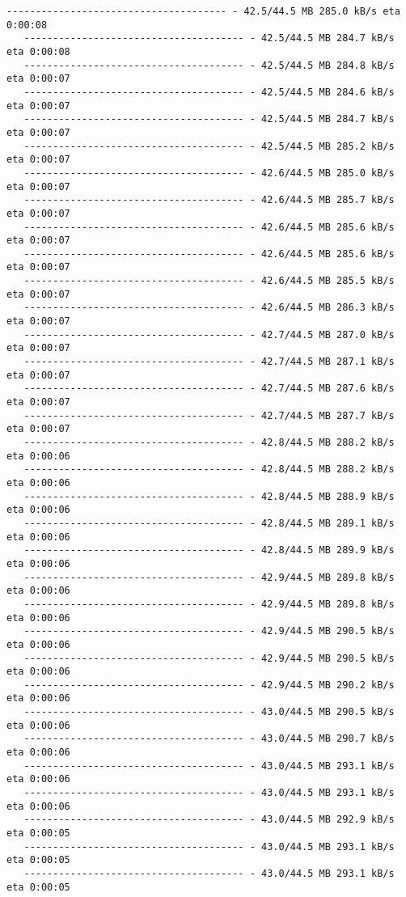 \documentclass[11pt]{article}
\begin{document}
\begin{Verbatim}[commandchars=\\\{\}]
   -------------------------------------- - 42.5/44.5 MB 285.0 kB/s eta 0:00:08
   -------------------------------------- - 42.5/44.5 MB 284.7 kB/s eta 0:00:08
   -------------------------------------- - 42.5/44.5 MB 284.8 kB/s eta 0:00:07
   -------------------------------------- - 42.5/44.5 MB 284.6 kB/s eta 0:00:07
   -------------------------------------- - 42.5/44.5 MB 284.7 kB/s eta 0:00:07
   -------------------------------------- - 42.5/44.5 MB 285.2 kB/s eta 0:00:07
   -------------------------------------- - 42.6/44.5 MB 285.0 kB/s eta 0:00:07
   -------------------------------------- - 42.6/44.5 MB 285.7 kB/s eta 0:00:07
   -------------------------------------- - 42.6/44.5 MB 285.6 kB/s eta 0:00:07
   -------------------------------------- - 42.6/44.5 MB 285.6 kB/s eta 0:00:07
   -------------------------------------- - 42.6/44.5 MB 285.5 kB/s eta 0:00:07
   -------------------------------------- - 42.6/44.5 MB 286.3 kB/s eta 0:00:07
   -------------------------------------- - 42.7/44.5 MB 287.0 kB/s eta 0:00:07
   -------------------------------------- - 42.7/44.5 MB 287.1 kB/s eta 0:00:07
   -------------------------------------- - 42.7/44.5 MB 287.6 kB/s eta 0:00:07
   -------------------------------------- - 42.7/44.5 MB 287.7 kB/s eta 0:00:07
   -------------------------------------- - 42.8/44.5 MB 288.2 kB/s eta 0:00:06
   -------------------------------------- - 42.8/44.5 MB 288.2 kB/s eta 0:00:06
   -------------------------------------- - 42.8/44.5 MB 288.9 kB/s eta 0:00:06
   -------------------------------------- - 42.8/44.5 MB 289.1 kB/s eta 0:00:06
   -------------------------------------- - 42.8/44.5 MB 289.9 kB/s eta 0:00:06
   -------------------------------------- - 42.9/44.5 MB 289.8 kB/s eta 0:00:06
   -------------------------------------- - 42.9/44.5 MB 289.8 kB/s eta 0:00:06
   -------------------------------------- - 42.9/44.5 MB 290.5 kB/s eta 0:00:06
   -------------------------------------- - 42.9/44.5 MB 290.5 kB/s eta 0:00:06
   -------------------------------------- - 42.9/44.5 MB 290.2 kB/s eta 0:00:06
   -------------------------------------- - 43.0/44.5 MB 290.5 kB/s eta 0:00:06
   -------------------------------------- - 43.0/44.5 MB 290.7 kB/s eta 0:00:06
   -------------------------------------- - 43.0/44.5 MB 293.1 kB/s eta 0:00:06
   -------------------------------------- - 43.0/44.5 MB 293.1 kB/s eta 0:00:06
   -------------------------------------- - 43.0/44.5 MB 292.9 kB/s eta 0:00:05
   -------------------------------------- - 43.0/44.5 MB 293.1 kB/s eta 0:00:05
   -------------------------------------- - 43.0/44.5 MB 293.1 kB/s eta 0:00:05

\end{Verbatim}
\end{document}
